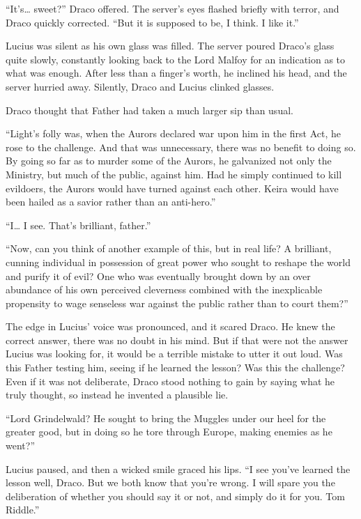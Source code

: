 “It’s… sweet?” Draco offered. The server’s eyes flashed briefly with terror, and Draco quickly corrected. “But it is supposed to be, I think. I like it.”

Lucius was silent as his own glass was filled. The server poured Draco’s glass quite slowly, constantly looking back to the Lord Malfoy for an indication as to what was enough. After less than a finger’s worth, he inclined his head, and the server hurried away. Silently, Draco and Lucius clinked glasses.

Draco thought that Father had taken a much larger sip than usual.

“Light’s folly was, when the Aurors declared war upon him in the first Act, he rose to the challenge. And that was unnecessary, there was no benefit to doing so. By going so far as to murder some of the Aurors, he galvanized not only the Ministry, but much of the public, against him. Had he simply continued to kill evildoers, the Aurors would have turned against each other. Keira would have been hailed as a savior rather than an anti-hero.”

“I… I see. That’s brilliant, father.”

“Now, can you think of another example of this, but in real life? A brilliant, cunning individual in possession of great power who sought to reshape the world and purify it of evil? One who was eventually brought down by an over abundance of his own perceived cleverness combined with the inexplicable propensity to wage senseless war against the public rather than to court them?”

The edge in Lucius’ voice was pronounced, and it scared Draco. He knew the correct answer, there was no doubt in his mind. But if that were not the answer Lucius was looking for, it would be a terrible mistake to utter it out loud. Was this Father testing him, seeing if he learned the lesson? Was this the challenge? Even if it was not deliberate, Draco stood nothing to gain by saying what he truly thought, so instead he invented a plausible lie.

“Lord Grindelwald? He sought to bring the Muggles under our heel for the greater good, but in doing so he tore through Europe, making enemies as he went?”

Lucius paused, and then a wicked smile graced his lips. “I see you’ve learned the lesson well, Draco. But we both know that you’re wrong. I will spare you the deliberation of whether you should say it or not, and simply do it for you. Tom Riddle.”


